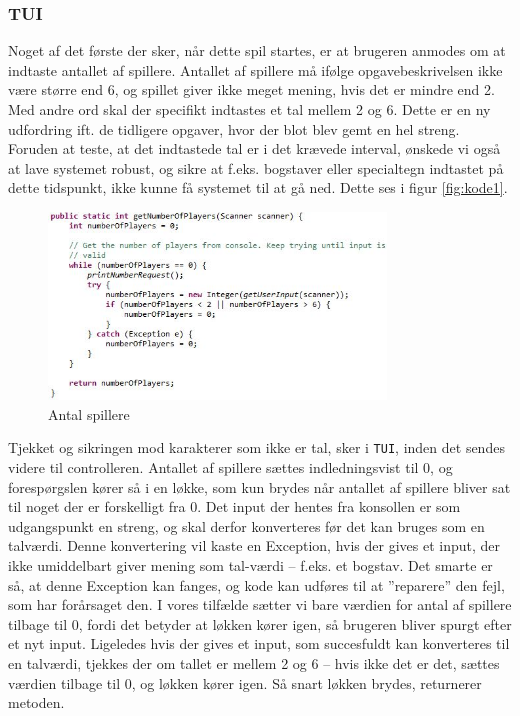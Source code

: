 \subsubsection{TUI}
Noget af det første der sker, når dette spil startes, er at brugeren anmodes om at indtaste antallet af spillere. Antallet af spillere må ifølge opgavebeskrivelsen ikke være større end 6, og spillet giver ikke meget mening, hvis det er mindre end 2. Med andre ord skal der specifikt indtastes et tal mellem 2 og 6. Dette er en ny udfordring ift. de tidligere opgaver, hvor der blot blev gemt en hel streng. Foruden at teste, at det indtastede tal er i det krævede interval, ønskede vi også at lave systemet robust, og sikre at f.eks. bogstaver eller specialtegn indtastet på dette tidspunkt, ikke kunne få systemet til at gå ned. Dette ses i figur \vref{fig:kode1}.
\begin{figure}[!ht]
\centering
\includegraphics[width=0.8\textwidth]{kode1.jpg}
\caption[<Text for the list of figures>]{Antal spillere}
\label{fig:kode1} 
\end{figure}
Tjekket og sikringen mod karakterer som ikke er tal, sker i \texttt{TUI}, inden det sendes videre til controlleren. Antallet af spillere sættes indledningsvist til 0, og forespørgslen kører så i en løkke, som kun brydes når antallet af spillere bliver sat til noget der er forskelligt fra 0. Det input der hentes fra konsollen er som udgangspunkt en streng, og skal derfor konverteres før det kan bruges som en talværdi. Denne konvertering vil kaste en Exception, hvis der gives et input, der ikke umiddelbart giver mening som tal-værdi – f.eks. et bogstav. Det smarte er så, at denne Exception kan fanges, og kode kan udføres til at ”reparere” den fejl, som har forårsaget den. I vores tilfælde sætter vi bare værdien for antal af spillere tilbage til 0, fordi det betyder at løkken kører igen, så brugeren bliver spurgt efter et nyt input.
Ligeledes hvis der gives et input, som succesfuldt kan konverteres til en talværdi, tjekkes der om tallet er mellem 2 og 6 – hvis ikke det er det, sættes værdien tilbage til 0, og løkken kører igen. Så snart løkken brydes, returnerer metoden.

